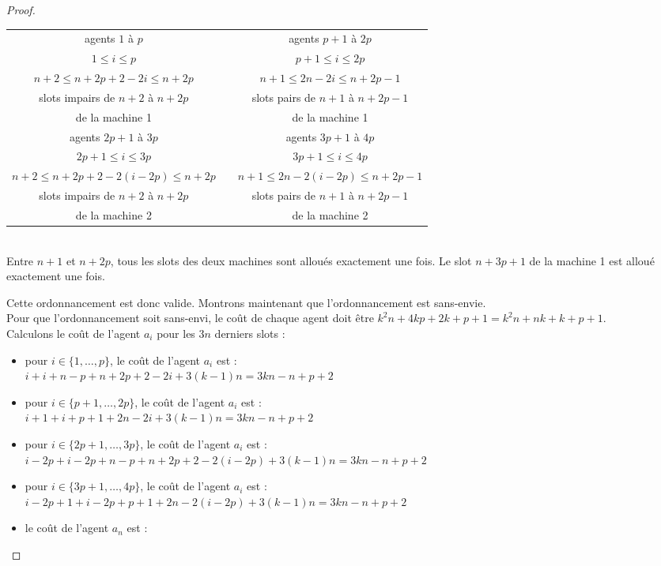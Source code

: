 \documentclass[12pt]{article}
\theoremstyle{definition}
\begin{document}
\begin{itemize}
\begin{proof}
\begin{itemize}
\begin{tabular}{ccc}
agents $1$ à $p$  & & agents $p+1$ à $2p$   \\
$1\leq i \leq p $ & & $p+1\leq i \leq 2p$   \\
$n+2 \leq n+2p+2-2i\leq n+2p$ & & $n+1\leq 2n-2i\leq n+2p-1$\\
slots impairs de $n+2$ à $n+2p$     & & slots pairs de $n+1$ à $n+2p-1$  \\
de la machine 1   & & de la machine 1       \\
\hline
agents $2p+1$ à $3p$ & & agents $3p+1$ à $4p$\\
$2p+1\leq i \leq 3p $ & & $3p+1\leq i \leq 4p$   \\
$n+2 \leq n+2p+2-2(i-2p)\leq n+2p$ & & $n+1\leq 2n-2(i-2p)\leq n+2p-1$\\
slots impairs de $n+2$ à $n+2p$     & & slots pairs de $n+1$ à $n+2p-1$  \\
de la machine 2   & & de la machine 2       \\
\end{tabular}\\
Entre $n+1$ et $n+2p$, tous les slots des deux machines sont alloués exactement une fois. Le slot $n+3p+1$ de la machine 1 est alloué exactement une fois.\\
\end{itemize}
Cette ordonnancement est donc valide. Montrons maintenant que l'ordonnancement est sans-envie. \\
Pour que l'ordonnancement soit sans-envi, le coût de chaque agent doit être $k^2n + 4kp + 2k + p + 1 = k^2n + nk +k+p+1$.\\
Calculons le coût de l'agent $a_i$ pour les $3n$ derniers slots :
\begin{itemize}
\item pour $i\in \{1,\dots,p \}$, le coût de l'agent $a_i$ est : \\
$i +i+n-p+n+2p+2-2i+ 3(k-1)n=3kn-n+p+2$
\item pour $i\in \{p+1,\dots,2p \}$, le coût de l'agent $a_i$ est : \\
$i+1+i+p+1+2n-2i+ 3(k-1)n=3kn-n+p+2$
\item pour $i\in \{2p+1,\dots,3p \}$, le coût de l'agent $a_i$ est :\\
$i-2p+i-2p+n-p+n+2p+2-2(i-2p)+ 3(k-1)n=3kn-n+p+2$
\item pour $i\in \{3p+1,\dots,4p \}$, le coût de l'agent $a_i$ est :\\
$i-2p+1+i-2p+p+1+2n-2(i-2p)+ 3(k-1)n = 3kn-n+p+2$
\item le coût de l'agent $a_n$ est :\\

\end{itemize}
\end{proof}
\end{itemize}
\end{document}
